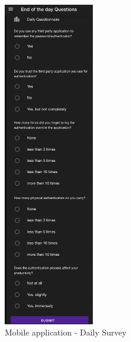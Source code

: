 \begin{figure}
\begin{center}
  \includegraphics[width=150]{images/daily-survey.png}
\end{center}
\caption{\label{fig:app-daily-survey} Mobile application - Daily Survey}
\end{figure}

